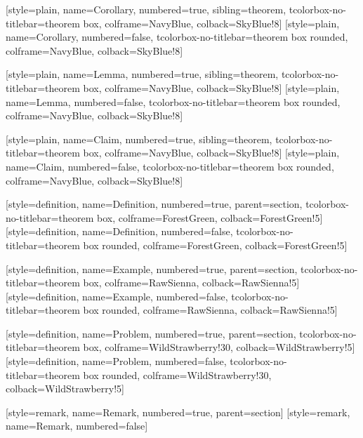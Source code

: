 [style=plain, name=Corollary, numbered=true, sibling=theorem,
    tcolorbox-no-titlebar={theorem box, colframe=NavyBlue, colback=SkyBlue!8}]
[style=plain, name=Corollary, numbered=false,
    tcolorbox-no-titlebar={theorem box rounded, colframe=NavyBlue, colback=SkyBlue!8}]

[style=plain, name=Lemma, numbered=true, sibling=theorem,
    tcolorbox-no-titlebar={theorem box, colframe=NavyBlue, colback=SkyBlue!8}]
[style=plain, name=Lemma, numbered=false,
    tcolorbox-no-titlebar={theorem box rounded, colframe=NavyBlue, colback=SkyBlue!8}]

[style=plain, name=Claim, numbered=true, sibling=theorem,
    tcolorbox-no-titlebar={theorem box, colframe=NavyBlue, colback=SkyBlue!8}]
[style=plain, name=Claim, numbered=false,
    tcolorbox-no-titlebar={theorem box rounded, colframe=NavyBlue, colback=SkyBlue!8}]

[style=definition, name=Definition, numbered=true, parent=section,
    tcolorbox-no-titlebar={theorem box, colframe=ForestGreen, colback=ForestGreen!5}]
[style=definition, name=Definition, numbered=false,
    tcolorbox-no-titlebar={theorem box rounded, colframe=ForestGreen, colback=ForestGreen!5}]

[style=definition, name=Example, numbered=true, parent=section,
    tcolorbox-no-titlebar={theorem box, colframe=RawSienna, colback=RawSienna!5}]
[style=definition, name=Example, numbered=false,
    tcolorbox-no-titlebar={theorem box rounded, colframe=RawSienna, colback=RawSienna!5}]

[style=definition, name=Problem, numbered=true, parent=section,
    tcolorbox-no-titlebar={theorem box, colframe=WildStrawberry!30, colback=WildStrawberry!5}]
[style=definition, name=Problem, numbered=false,
    tcolorbox-no-titlebar={theorem box rounded, colframe=WildStrawberry!30, colback=WildStrawberry!5}]

[style=remark, name=Remark, numbered=true, parent=section]
[style=remark, name=Remark, numbered=false]

\newcommand{\notehandmark}{\llap{\raisebox{0.05ex}{\large\ding{45}}\hspace{0.6em}}}

